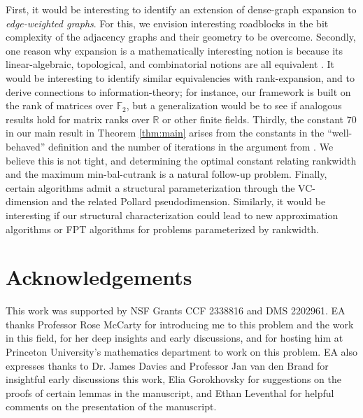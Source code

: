 \documentclass{article}
\theoremstyle{definition}
\begin{document}
First, it would be interesting to identify an extension of dense-graph expansion to \emph{edge-weighted graphs}. For this, we envision interesting roadblocks in the bit complexity of the adjacency graphs \cite{anand2024bitcomplexitydynamicalgebraic} and their geometry \cite{gotlib2023highperspectivehighdimensional} to be overcome. 
Secondly, one reason why expansion is a mathematically interesting notion is because its linear-algebraic, topological, and combinatorial notions are all equivalent \cite{Hoory2006}. It would be interesting to identify similar equivalencies with rank-expansion, and to derive connections to information-theory; for instance, our framework is built on the rank of matrices over $\mathbb{F}_2$, but a generalization would be to see if analogous results hold for matrix ranks over $\mathbb{R}$ or other finite fields. 
Thirdly, the constant $70$ in our main result in Theorem \ref{thm:main} arises from the constants in the ``well-behaved'' definition and the number of iterations in the argument from \cite{Dvorak_Norin_2018}. We believe this is not tight, and determining the optimal constant relating rankwidth and the maximum min-bal-cutrank is a natural follow-up problem. 
Finally, certain algorithms admit a structural parameterization through the VC-dimension \cite{pmlr-v49-alon16, anand2025structuralcomplexitymatrixvectormultiplication,chan2025trulysubquadratictimealgorithms,duraj2024betterdiameteralgorithmsbounded, karczmarz2024subquadraticalgorithmsminorfreedigraphs} and the related Pollard pseudodimension. Similarly, it would be interesting if our structural characterization could lead to new approximation algorithms or FPT algorithms for problems parameterized by rankwidth.\\
   

\section{Acknowledgements}
This work was supported by NSF Grants CCF 2338816 and DMS 2202961. EA thanks Professor Rose McCarty for introducing me to this problem and the work in this field, for her deep insights and early discussions, and for hosting him at Princeton University's mathematics department to work on this problem. EA also expresses thanks to Dr. James Davies and Professor Jan van den Brand for insightful early discussions this work, Elia Gorokhovsky for suggestions on the proofs of certain lemmas in the manuscript, and Ethan Leventhal for helpful comments on the presentation of the manuscript.\\
 
 


\end{document}
